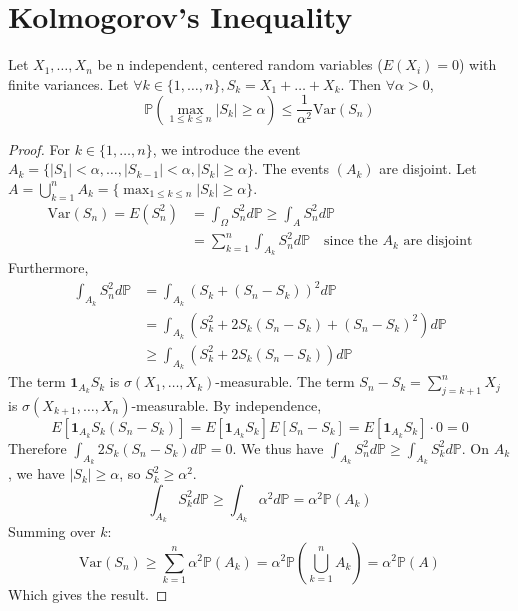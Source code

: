 \section{Kolmogorov's Inequality}%
\begin{theorem}
Let $X_1, \dots, X_n$ be n independent, centered random variables ($E(X_i)=0$) with finite variances.
Let $\forall k \in \{1, \dots, n\}, S_k = X_1 + \dots + X_k$.
Then $\forall \alpha > 0$,
\[ \mathbb{P}(\max_{1 \le k \le n} |S_k| \ge \alpha) \le \frac{1}{\alpha^2} \mathrm{Var}(S_n) \]
\end{theorem}%
\begin{proof}
For $k \in \{1, \dots, n\}$, we introduce the event $A_k = \{|S_1| < \alpha, \dots, |S_{k-1}| < \alpha, |S_k| \ge \alpha\}$.
The events $(A_k)$ are disjoint. Let $A = \bigcup_{k=1}^n A_k = \{ \max_{1 \le k \le n} |S_k| \ge \alpha \}$.
\begin{align*}
    \mathrm{Var}(S_n) = E(S_n^2) &= \int_\Omega S_n^2 d\mathbb{P} \ge \int_A S_n^2 d\mathbb{P} \\
    &= \sum_{k=1}^n \int_{A_k} S_n^2 d\mathbb{P} \quad \text{since the } A_k \text{ are disjoint}
\end{align*}
Furthermore, 
\begin{align*}
    \int_{A_k} S_n^2 d\mathbb{P} &= \int_{A_k} (S_k + (S_n - S_k))^2 d\mathbb{P} \\
    &= \int_{A_k} \left( S_k^2 + 2S_k(S_n - S_k) + (S_n - S_k)^2 \right) d\mathbb{P} \\
    &\ge \int_{A_k} \left( S_k^2 + 2S_k(S_n - S_k) \right) d\mathbb{P}
\end{align*}
The term $\mathbf{1}_{A_k} S_k$ is $\sigma(X_1, \dots, X_k)$-measurable. The term $S_n - S_k = \sum_{j=k+1}^n X_j$ is $\sigma(X_{k+1}, \dots, X_n)$-measurable. By independence,
\[ E[\mathbf{1}_{A_k} S_k (S_n - S_k)] = E[\mathbf{1}_{A_k} S_k] E[S_n - S_k] = E[\mathbf{1}_{A_k} S_k] \cdot 0 = 0 \]
Therefore $\int_{A_k} 2S_k(S_n - S_k) d\mathbb{P} = 0$.
We thus have $\int_{A_k} S_n^2 d\mathbb{P} \ge \int_{A_k} S_k^2 d\mathbb{P}$.
On $A_k$, we have $|S_k| \ge \alpha$, so $S_k^2 \ge \alpha^2$.
\[ \int_{A_k} S_k^2 d\mathbb{P} \ge \int_{A_k} \alpha^2 d\mathbb{P} = \alpha^2 \mathbb{P}(A_k) \]
Summing over $k$:
\[ \mathrm{Var}(S_n) \ge \sum_{k=1}^n \alpha^2 \mathbb{P}(A_k) = \alpha^2 \mathbb{P}\left(\bigcup_{k=1}^n A_k\right) = \alpha^2 \mathbb{P}(A) \]
Which gives the result.
\end{proof}%
